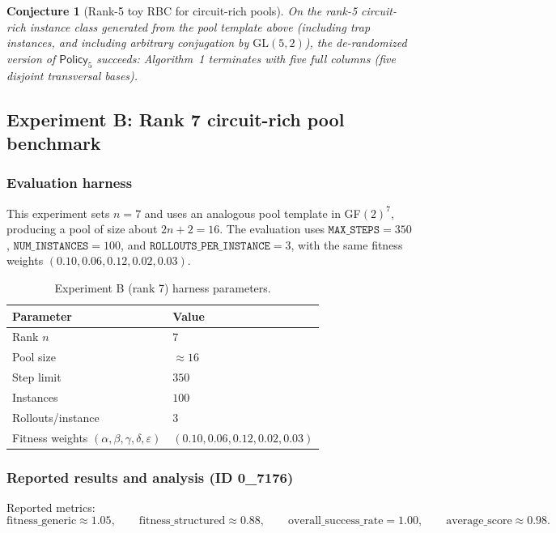 \documentclass[11pt]{amsart}
\newtheorem{conjecture}{Conjecture}
\begin{document}
\begin{conjecture}[Rank-5 toy RBC for circuit-rich pools]
\label{conj:toy5}
On the rank-5 circuit-rich instance class generated from the pool template above (including trap instances, and including arbitrary conjugation by $\mathrm{GL}(5,2)$), the de-randomized version of $\mathsf{Policy}_5$ succeeds: Algorithm~1 terminates with five full columns (five disjoint transversal bases).
\end{conjecture}

\subsection{Experiment B: Rank 7 circuit-rich pool benchmark}
\label{sec:expB}

\subsubsection{Evaluation harness}

This experiment sets $n=7$ and uses an analogous pool template in GF$(2)^7$, producing a pool of size about $2n+2=16$.
The evaluation uses $\texttt{MAX\_STEPS}=350$, $\texttt{NUM\_INSTANCES}=100$, and $\texttt{ROLLOUTS\_PER\_INSTANCE}=3$, with the same fitness weights $(0.10,0.06,0.12,0.02,0.03)$.

\begin{table}[h]
\centering
\caption{Experiment B (rank 7) harness parameters.}
\begin{tabular}{@{}ll@{}}
\toprule
Parameter & Value \\
\midrule
Rank $n$ & $7$ \\
Pool size & $\approx 16$ \\
Step limit & $350$ \\
Instances & $100$ \\
Rollouts/instance & $3$ \\
Fitness weights $(\alpha,\beta,\gamma,\delta,\varepsilon)$ & $(0.10,0.06,0.12,0.02,0.03)$ \\
\bottomrule
\end{tabular}
\end{table}

\subsubsection{Reported results and analysis (ID 0\_7176)}

Reported metrics:
\[
\text{fitness\_generic}\approx 1.05,\qquad
\text{fitness\_structured}\approx 0.88,\qquad
\text{overall\_success\_rate}=1.00,\qquad
\text{average\_score}\approx 0.98.
\]
\end{document}
